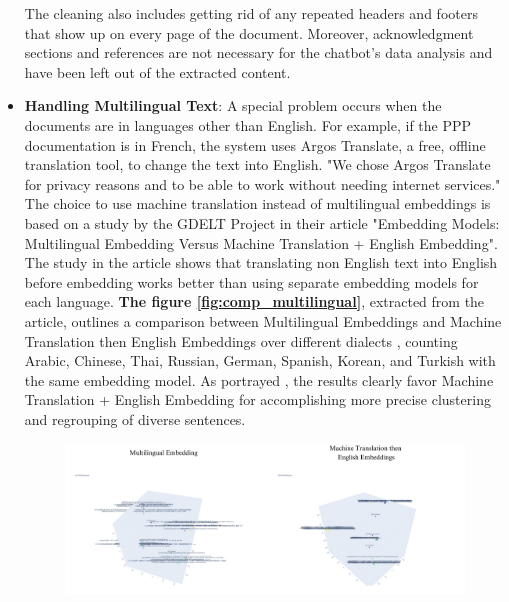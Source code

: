 \begin{itemize}
\vskip 0.5cm
The cleaning also includes getting rid of any repeated headers and footers that show up on every page of the document. Moreover, acknowledgment sections and references are not necessary for the chatbot's data analysis and have been left out of the extracted content.
\vskip 0.5cm
\item \textbf{Handling Multilingual Text}: A special problem occurs when the documents are in languages other than English. For example, if the PPP documentation is in French, the system uses Argos Translate, a free, offline translation tool, to change the text into English. "We chose Argos Translate for privacy reasons and to be able to work without needing internet services."%
\vskip 0.5cm
The choice to use machine translation instead of multilingual embeddings is based on a study by the GDELT Project in their article "Embedding Models: Multilingual Embedding Versus Machine Translation + English Embedding". The study in the article shows that translating non English text into English before embedding works better than using separate embedding models for each language.\textbf{ The figure \ref{fig:comp_multilingual}}, extracted from the article, outlines a comparison between Multilingual Embeddings and Machine Translation then English Embeddings over different dialects , counting Arabic, Chinese, Thai, Russian, German, Spanish, Korean, and Turkish with the same embedding model. As portrayed , the results clearly favor Machine Translation + English Embedding for accomplishing more precise clustering and regrouping of diverse sentences.
\begin{figure}[H]
    \centering
    \includegraphics[width=1 \linewidth]{assets/comp_multi.png}

\end{figure}
\end{itemize}
